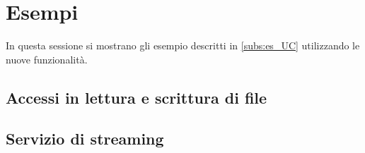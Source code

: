 \section{Esempi}
\label{sec:Esempi}
In questa sessione si mostrano gli esempio descritti in \ref{subs:es_UC} utilizzando le nuove funzionalità.
\subsection{Accessi in lettura e scrittura di file}
\label{sub:RW_Code_Sec}


\subsection{Servizio di streaming}
\label{sub:Stream_Code_Sec}


